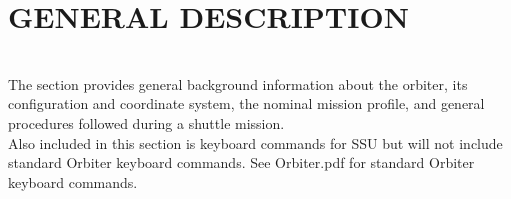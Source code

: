 \documentclass[13pt]{article}
\begin{document}
\newpage
\section{GENERAL DESCRIPTION}
\begin{multicols*}{2}
\renewcommand{\cfttoctitlefont}{\bf}
\localtableofcontents
\noindent
\\
The section provides general background information about the orbiter, its configuration and coordinate system, the nominal mission profile, and general procedures followed during a shuttle mission.
\\
Also included in this section is keyboard commands for SSU but will not include standard Orbiter keyboard commands. See Orbiter.pdf for standard Orbiter keyboard commands.
\end{multicols*}
\end{document}
